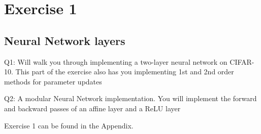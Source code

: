 \graphicspath{{Chapters/Exercise1/}}

\chapter{Exercise 1}

\section{Neural Network layers} %
\label{sec:Neural_Networ_layers}





Q1: Will walk you through implementing a two-layer neural network on CIFAR-10.
This part of the exercise also has you implementing 1st and 2nd order methods for parameter updates

Q2: A modular Neural Network implementation. You will implement the forward and
backward passes of an affine layer and a ReLU layer


Exercise 1 can be found in the Appendix. 

